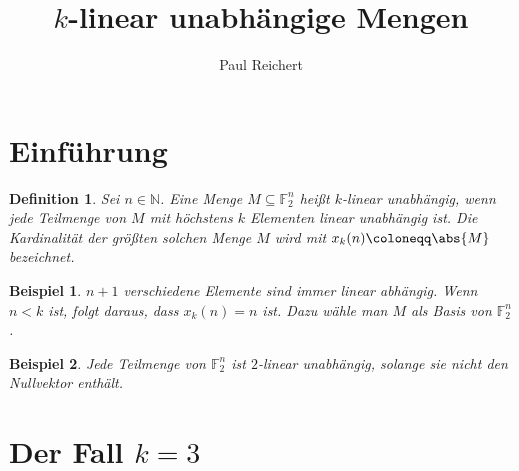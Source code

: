 \documentclass[a4paper]{scrartcl}
\theoremstyle{break}
\newtheorem{example}{Beispiel}
\newtheorem{definition}{Definition}
\newcommand{\N}{\mathbb{N}}
\newcommand{\F}{\mathbb{F}}
\begin{document}
\title{$k$-linear unabhängige Mengen}
\author{Paul Reichert}
\maketitle

\section{Einführung}

\begin{definition}
  Sei $n \in \N$. Eine Menge $M \subseteq \F_2^n$ heißt $k$-linear unabhängig, wenn
  jede Teilmenge von $M$ mit höchstens $k$ Elementen linear unabhängig ist.
  Die Kardinalität der größten solchen Menge $M$ wird mit $x_k(n) \coloneqq \abs{M}$ bezeichnet.
\end{definition}

\begin{example} \label{ex1}
  $n + 1$ verschiedene Elemente sind immer linear abhängig. Wenn $n < k$ ist, folgt daraus, dass
  $x_k(n) = n$ ist. Dazu wähle man $M$ als Basis von $\F_2^n$.
\end{example}

\begin{example}
  Jede Teilmenge von $\F_2^n$ ist $2$-linear unabhängig, solange sie nicht den Nullvektor enthält.
\end{example}

\section{Der Fall $k = 3$}
\end{document}
